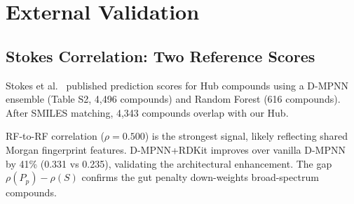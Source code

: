 \documentclass{article}
\begin{document}

\section{External Validation}
\label{app:external}

\subsection{Stokes Correlation: Two Reference Scores}

Stokes et al.~\citep{stokes2020} published prediction scores for Hub compounds using a D-MPNN ensemble (Table S2, 4,496 compounds) and Random Forest (616 compounds).
After SMILES matching, 4,343 compounds overlap with our Hub.

\begin{table}[ht]
\caption{Full Stokes external validation. Left: Spearman $\rho$ between our predictions and Stokes D-MPNN scores for 4,343 overlapping Hub compounds. Right: correlation with Stokes RF scores for 616 compounds. The gap $\rho(P_p) - \rho(S)$ quantifies how the gut penalty down-weights broad-spectrum compounds relative to pathogen-only predictions.}
\label{tab:stokes_full}
\centering
\scriptsize
{}
\end{table}

RF-to-RF correlation ($\rho = 0.500$) is the strongest signal, likely reflecting shared Morgan fingerprint features.
D-MPNN+RDKit improves over vanilla D-MPNN by 41\% (0.331 vs 0.235), validating the architectural enhancement.
The gap $\rho(P_p) - \rho(S)$ confirms the gut penalty down-weights broad-spectrum compounds.
\end{document}
